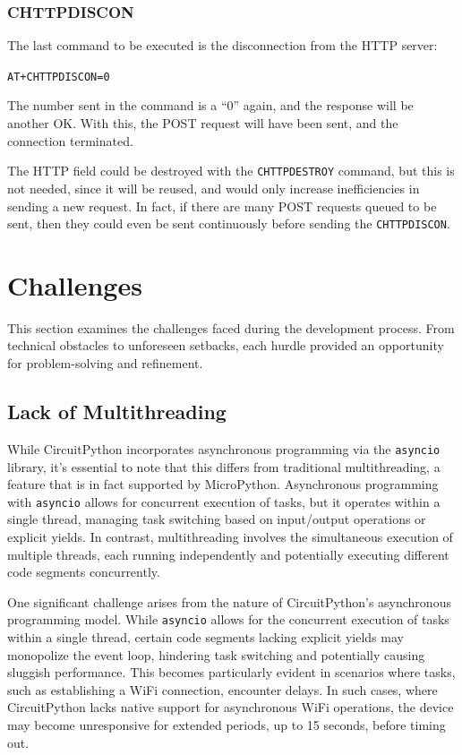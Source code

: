 \subsubsection*{CHTTPDISCON}
The last command to be executed is the disconnection from the HTTP server:
\begin{center}
	\texttt{AT+CHTTPDISCON=0}
\end{center}

The number sent in the command is a ``0'' again, and the response will be another OK. With this, 
the POST request will have been sent, and the connection terminated.

The HTTP field could be destroyed with the \texttt{CHTTPDESTROY} command, but this is not needed, 
since it will be reused, and would only increase inefficiencies in sending a new request. In fact, 
if there are many POST requests queued to be sent, then they could even be sent continuously before 
sending the \texttt{CHTTPDISCON}.

\section{Challenges}

This section examines the challenges faced during the development process. From technical obstacles 
to unforeseen setbacks, each hurdle provided an opportunity for problem-solving and refinement.

\subsection{Lack of Multithreading}

While CircuitPython incorporates asynchronous programming via the \texttt{asyncio} library, it's 
essential to note that this differs from traditional multithreading, a feature that is in fact 
supported by MicroPython. Asynchronous programming with \texttt{asyncio} allows for concurrent 
execution of tasks, but it operates within a single thread, managing task switching based on 
input/output operations or explicit yields. In contrast, multithreading involves the simultaneous 
execution of multiple threads, each running independently and potentially executing different code 
segments concurrently.

One significant challenge arises from the nature of CircuitPython's asynchronous programming model. 
While \texttt{asyncio} allows for the concurrent execution of tasks within a single thread, certain 
code segments lacking explicit yields may monopolize the event loop, hindering task switching and 
potentially causing sluggish performance. This becomes particularly evident in scenarios where 
tasks, such as establishing a WiFi connection, encounter delays. In such cases, where CircuitPython 
lacks native support for asynchronous WiFi operations, the device may become unresponsive for 
extended periods, up to 15 seconds, before timing out.

